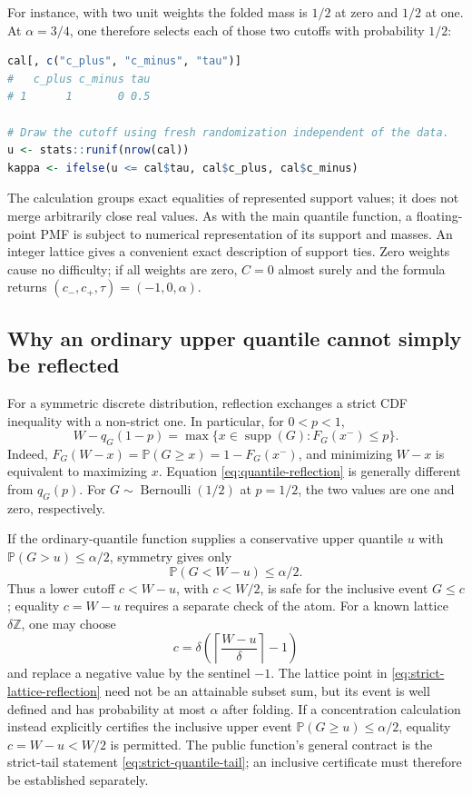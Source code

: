 \documentclass[11pt,letterpaper]{article}
\numberwithin{equation}{section}
\theoremstyle{definition}
\theoremstyle{remark}
\begin{document}
For instance, with two unit weights the folded mass is $1/2$ at zero
and $1/2$ at one.  At $\alpha=3/4$, one therefore selects each of those
two cutoffs with probability $1/2$:
\begin{lstlisting}[language=R]
cal[, c("c_plus", "c_minus", "tau")]
#   c_plus c_minus tau
# 1      1       0 0.5

# Draw the cutoff using fresh randomization independent of the data.
u <- stats::runif(nrow(cal))
kappa <- ifelse(u <= cal$tau, cal$c_plus, cal$c_minus)
\end{lstlisting}

The calculation groups exact equalities of represented support values; it does
not merge arbitrarily close real values.  As with the main quantile
function, a floating-point PMF is subject to numerical representation
of its support and masses.  An integer lattice gives a convenient exact
description of support ties.  Zero weights cause no difficulty; if all
weights are zero, $C=0$ almost surely and the formula returns
$(c_-,c_+,\tau)=(-1,0,\alpha)$.

\subsection{Why an ordinary upper quantile cannot simply be reflected}

For a symmetric discrete distribution, reflection exchanges a strict
CDF inequality with a non-strict one.  In particular, for $0<p<1$,
\begin{equation}
 W-q_G(1-p)
 =\max\{x\in\operatorname{supp}(G):F_G(x^-)\le p\}.
 \label{eq:quantile-reflection}
\end{equation}
Indeed, $F_G(W-x)=\mathbb P(G\ge x)=1-F_G(x^-)$, and minimizing $W-x$
is equivalent to maximizing $x$.  Equation
\eqref{eq:quantile-reflection} is generally different from $q_G(p)$.
For $G\sim\operatorname{Bernoulli}(1/2)$ at $p=1/2$, the two values
are one and zero, respectively.

If the ordinary-quantile function supplies a conservative upper quantile
$u$ with $\mathbb P(G>u)\le\alpha/2$, symmetry gives only
\[
 \mathbb P(G<W-u)\le\alpha/2.
\]
Thus a lower cutoff $c<W-u$, with $c<W/2$, is safe for the inclusive
event $G\le c$; equality $c=W-u$ requires a separate check of the atom.
For a known lattice $\delta\mathbb Z$, one may choose
\begin{equation}
 c=\delta\left(\left\lceil\frac{W-u}{\delta}\right\rceil-1\right)
 \label{eq:strict-lattice-reflection}
\end{equation}
and replace a negative value by the sentinel $-1$.  The lattice point in
\eqref{eq:strict-lattice-reflection} need not be an attainable subset sum,
but its event is well defined and has probability at most $\alpha$ after
folding.  If a concentration calculation instead explicitly certifies
the inclusive upper event $\mathbb P(G\ge u)\le\alpha/2$, equality
$c=W-u<W/2$ is permitted.  The public function's general contract is
the strict-tail statement \eqref{eq:strict-quantile-tail}; an inclusive
certificate must therefore be established separately.
\end{document}
